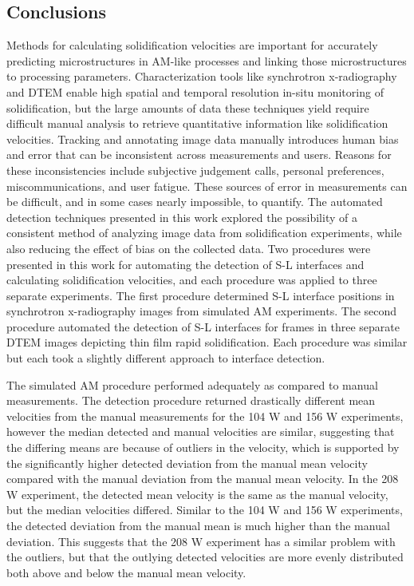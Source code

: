 \subsection{Conclusions}
Methods for calculating solidification velocities are important
for accurately predicting microstructures in AM-like processes
and linking those microstructures to processing parameters.
Characterization tools like synchrotron
x-radiography and DTEM enable high spatial and temporal resolution in-situ
monitoring of solidification, but the large amounts of data these
techniques yield require difficult manual analysis to retrieve
quantitative information like solidification velocities. Tracking and
annotating image data manually introduces human bias and error that can be
inconsistent across measurements and users. Reasons for these
inconsistencies include subjective judgement calls, personal preferences,
miscommunications, and user fatigue. These sources of error in
measurements can be difficult, and in some cases nearly impossible, to
quantify. The automated detection techniques presented in this work
explored the possibility of a consistent method of analyzing image data
from solidification experiments, while also reducing the effect of bias on
the collected data. Two procedures were presented in this work for
automating the detection of S-L interfaces and calculating solidification
velocities, and each procedure was applied to three separate experiments.
The first procedure determined S-L interface positions in synchrotron
x-radiography images from simulated AM experiments. The second procedure
automated the detection of S-L interfaces for frames in three
separate DTEM images depicting thin film rapid solidification.
Each procedure was similar but each took a slightly different approach to
interface detection.

The simulated AM procedure performed adequately as compared to manual
measurements.
The detection procedure returned drastically different mean velocities from
the manual measurements for the 104 W and 156 W experiments, however the median
detected and manual velocities are similar, suggesting that the differing
means are because of outliers in the velocity, which is supported by the
significantly higher detected deviation from the manual mean velocity
compared with the manual deviation from the manual mean velocity.
In the 208 W experiment, the detected mean velocity is the same as the
manual velocity, but the median velocities differed. Similar to the 104 W
and 156 W experiments, the detected deviation from the manual mean is much
higher than the manual deviation. This suggests that the 208 W experiment
has a similar problem with the outliers, but that the outlying detected
velocities are more evenly distributed both above and below the manual
mean velocity.

